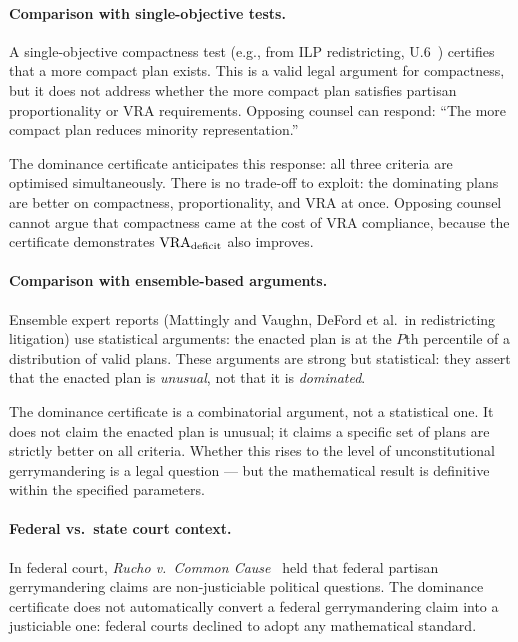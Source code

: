 \paragraph{Comparison with single-objective tests.}
A single-objective compactness test (e.g., from ILP redistricting,
U.6~\citep{dellaLibera2026ilp}) certifies that a more compact plan exists.
This is a valid legal argument for compactness, but it does not address whether
the more compact plan satisfies partisan proportionality or VRA requirements.
Opposing counsel can respond: ``The more compact plan reduces minority
representation.''

The dominance certificate anticipates this response: all three criteria are
optimised simultaneously.
There is no trade-off to exploit: the dominating plans are better on
compactness, proportionality, and VRA at once.
Opposing counsel cannot argue that compactness came at the cost of VRA
compliance, because the certificate demonstrates $\mathrm{VRA}_{\mathrm{deficit}}$ also improves.

\paragraph{Comparison with ensemble-based arguments.}
Ensemble expert reports (Mattingly and Vaughn, DeFord et al.\ in redistricting
litigation) use statistical arguments: the enacted plan is at the $P$th
percentile of a distribution of valid plans.
These arguments are strong but statistical: they assert that the enacted plan
is \emph{unusual}, not that it is \emph{dominated}.

The dominance certificate is a combinatorial argument, not a statistical one.
It does not claim the enacted plan is unusual; it claims a specific set of
plans are strictly better on all criteria.
Whether this rises to the level of unconstitutional gerrymandering is a
legal question --- but the mathematical result is definitive within the
specified parameters.

\paragraph{Federal vs.\ state court context.}
In federal court, \textit{Rucho v.\ Common Cause}~\citep{rucho2019} held that
federal partisan gerrymandering claims are non-justiciable political questions.
The dominance certificate does not automatically convert a federal gerrymandering
claim into a justiciable one: federal courts declined to adopt any mathematical
standard.

